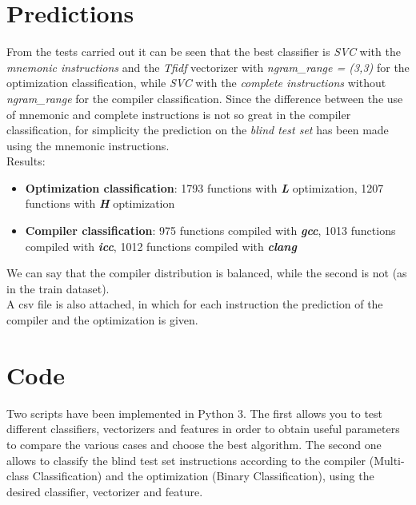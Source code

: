 \documentclass[11pt]{article}
\begin{document}
\section{Predictions}
From the tests carried out it can be seen that the best classifier is \textit{SVC} with the \textit{mnemonic instructions} and the \textit{Tfidf} vectorizer with \textit{ngram\_range = (3,3)}  for the optimization classification, while \textit{SVC} with the \textit{complete instructions} without \textit{ngram\_range} for the compiler classification. Since the difference between the use of mnemonic and complete instructions is not so great in the compiler classification, for simplicity the prediction on the \textit{blind test set} has been made using the mnemonic instructions. \\
Results:
\begin{itemize}
	\item \textbf{Optimization classification}: 1793 functions with \textbf{\textit{L}} optimization, 1207 functions with \textbf{\textit{H}} optimization
	\item \textbf{Compiler classification}: 975 functions compiled with \textbf{\textit{gcc}}, 1013 functions compiled with \textbf{\textit{icc}}, 1012 functions compiled with \textbf{\textit{clang}}
\end{itemize}
We can say that the compiler distribution is balanced, while the second is not (as in the train dataset). \\
A csv file is also attached, in which for each instruction the prediction of the compiler and the optimization is given.

\section{Code}
Two scripts have been implemented in Python 3. The first allows you to test different classifiers, vectorizers and features in order to obtain useful parameters to compare the various cases and choose the best algorithm. The second one allows to classify the blind test set instructions according to the compiler (Multi-class Classification) and the optimization (Binary Classification), using the desired classifier, vectorizer and feature.
\end{document}
